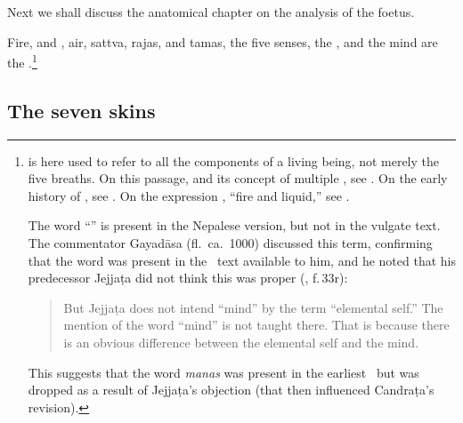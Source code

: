 \begin{translation}

  
\bigskip       

\item[1]

Next we shall discuss the anatomical chapter on the analysis of the foetus.
 
\item[3]

\newenvironment{tightquote}
    {\list{}{\listparindent 1.5em%
          \itemindent    \listparindent
          \rightmargin   \leftmargin
          \parsep        \z@ \@plus\p@}%
      \item\relax}
  {\endlist}

Fire, and , air, sattva, rajas, and tamas, the five
senses, the , and the mind
are the .\footnote{ is here used to 
refer to all the components of a living being, not merely the five breaths.
On this passage, and its concept of multiple , see 
\cite[\S3.2.3]{kleb-2021b}.
On the early history of , see \cite{zysk-1993,zysk-2007}.
On the expression ,  “fire and liquid,” see 
\cite{wuja-2004,ange-2021}.

The word “” is present in the Nepalese version, but not
in the vulgate text.  The commentator Gayadāsa (fl.\ ca.\ 1000)
discussed this term, confirming that the word was present in the \SS\
text available to him, and he noted that his predecessor Jejjaṭa did
not think this was proper (\MS{Cambridge Add.2491}, f.\,33r):
\begin{quote}
\par  But Jejjaṭa does not intend “mind” by
the term “elemental self.”  The mention of the word “mind” is not
taught there. That is because there is an obvious difference between
the elemental self and the mind.
\end{quote}
This suggests that the word \emph{manas} was present in the earliest
\SS\ but was dropped as a result of Jejjaṭa's objection (that then
influenced Candraṭa's revision).}


\subsection{The seven skins}


\end{translation}
